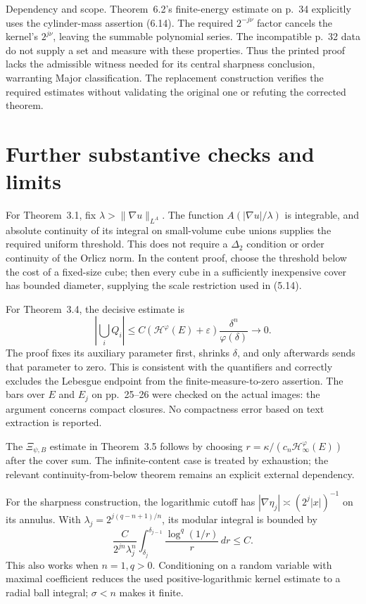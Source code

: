 \documentclass[10pt]{article}
\begin{document}
Dependency and scope. Theorem 6.2’s finite-energy estimate on p. 34 explicitly uses the cylinder-mass assertion (6.14). The required \(2^{-j\nu}\) factor cancels the kernel’s \(2^{j\nu}\), leaving the summable polynomial series. The incompatible p. 32 data do not supply a set and measure with these properties. Thus the printed proof lacks the admissible witness needed for its central sharpness conclusion, warranting Major classification. The replacement construction verifies the required estimates without validating the original one or refuting the corrected theorem.\par
\section*{Further substantive checks and limits}
For Theorem 3.1, fix \(\lambda>\|\nabla u\|_{L^A}\). The function \(A(|\nabla u|/\lambda)\) is integrable, and absolute continuity of its integral on small-volume cube unions supplies the required uniform threshold. This does not require a \(\Delta_2\) condition or order continuity of the Orlicz norm. In the content proof, choose the threshold below the cost of a fixed-size cube; then every cube in a sufficiently inexpensive cover has bounded diameter, supplying the scale restriction used in (5.14).\par
For Theorem 3.4, the decisive estimate is \[\left|\bigcup_iQ_i\right|
 \le C(\mathcal H^\varphi(E)+\varepsilon)
       \frac{\delta^n}{\varphi(\delta)}
 \longrightarrow0.\] The proof fixes its auxiliary parameter first, shrinks \(\delta\), and only afterwards sends that parameter to zero. This is consistent with the quantifiers and correctly excludes the Lebesgue endpoint from the finite-measure-to-zero assertion. The bars over \(E\) and \(E_j\) on pp. 25–26 were checked on the actual images: the argument concerns compact closures. No compactness error based on text extraction is reported.\par
The \(\Xi_{\psi,B}\) estimate in Theorem 3.5 follows by choosing \(r=\kappa/(c_n\mathcal H_\infty^\varphi(E))\) after the cover sum. The infinite-content case is treated by exhaustion; the relevant continuity-from-below theorem remains an explicit external dependency.\par
For the sharpness construction, the logarithmic cutoff has \(|\nabla\eta_j|\asymp(2^j|x|)^{-1}\) on its annulus. With \(\lambda_j=2^{j(q-n+1)/n}\), its modular integral is bounded by \[\frac{C}{2^{jn}\lambda_j^n}
 \int_{\delta_j}^{\delta_{j-1}}
 \frac{\log^q(1/r)}r\,dr\le C.\] This also works when \(n=1,q>0\). Conditioning on a random variable with maximal coefficient reduces the used positive-logarithmic kernel estimate to a radial ball integral; \(\sigma<n\) makes it finite.\par
\end{document}
